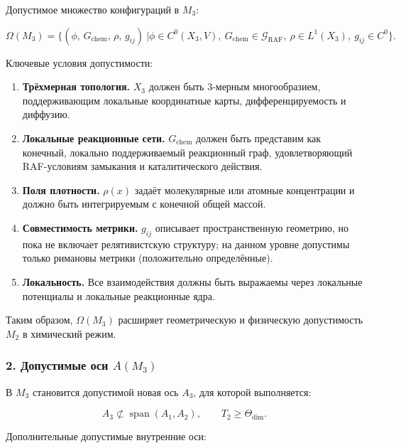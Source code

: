 Допустимое множество конфигураций в $M_3$:

\[
\Omega(M_3)
=
\Big\{
(\phi,\, G_{\mathrm{chem}},\, \rho,\, g_{ij}) \ \Big|
\phi \in C^{0}(X_3, V),\
G_{\mathrm{chem}} \in \mathcal{G}_{\mathrm{RAF}},\
\rho \in L^1(X_3),\
g_{ij}\in C^{0}
\Big\}.
\]

Ключевые условия допустимости:

\begin{enumerate}
    \item \textbf{Трёхмерная топология.}
    $X_3$ должен быть 3-мерным многообразием, поддерживающим локальные
    координатные карты, дифференцируемость и диффузию.

    \item \textbf{Локальные реакционные сети.}
    $G_{\mathrm{chem}}$ должен быть представим как конечный, локально
    поддерживаемый реакционный граф, удовлетворяющий RAF-условиям замыкания
    и каталитического действия.

    \item \textbf{Поля плотности.}
    $\rho(x)$ задаёт молекулярные или атомные концентрации и должно
    быть интегрируемым с конечной общей массой.

    \item \textbf{Совместимость метрики.}
    $g_{ij}$ описывает пространственную геометрию, но пока не включает
    релятивистскую структуру; на данном уровне допустимы только
    римановы метрики (положительно определённые).

    \item \textbf{Локальность.}
    Все взаимодействия должны быть выражаемы через локальные потенциалы
    и локальные реакционные ядра.
\end{enumerate}

Таким образом, $\Omega(M_3)$ расширяет геометрическую и физическую
допустимость $M_2$ в химический режим.

\subsubsection*{2. Допустимые оси \texorpdfstring{$A(M_3)$}{A(M_3)}}

В $M_3$ становится допустимой новая ось $A_3$, для которой выполняется:

\[
A_3 \not\subset \operatorname{span}(A_1, A_2),
\qquad
T_2 \ge \Theta_{\mathrm{dim}}.
\]

Дополнительные допустимые внутренние оси:

